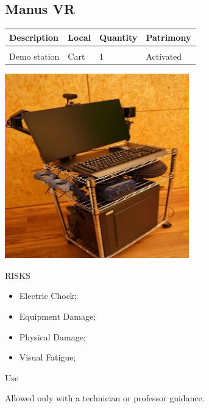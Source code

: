 \subsection{Manus VR}
\begin{tabularx}{\textwidth}{ Y  Y  Y  Y }
    \textbf{Description} &  \textbf{Local} &  \textbf{Quantity} & \textbf{Patrimony}\\
    \hline \\
     Demo station & Cart & 1 & Activated
\end{tabularx}
\vspace{1cm}

\begin{multicols}{2}

\includegraphics[width=80mm, keepaspectratio]{imgs/image3.jpg}

\columnbreak

\begin{mdframed}[roundcorner=10pt, linecolor=red, linewidth=2pt]
\vspace{1em}
{\Large {\color{red}RISKS}}
\vspace{1em}

\begin{itemize}
    \item Electric Chock;
    \item Equipment Damage;
    \item Physical Damage;
    \item Visual Fatigue; 
\end{itemize}

\vspace{1em}
\end{mdframed}

\vspace{2em}

{\Large Use}
\vspace{1em}

Allowed only with a technician or professor guidance.
\end{multicols}

